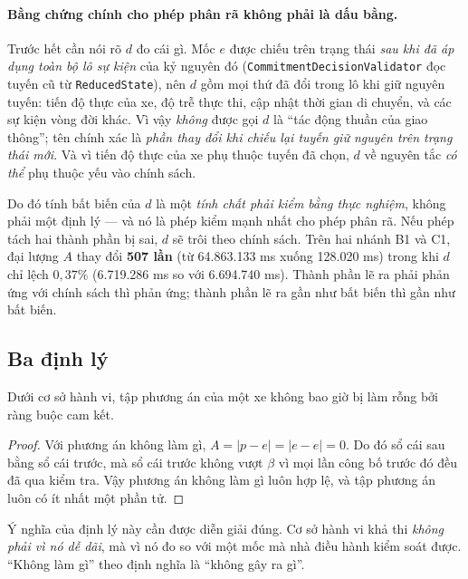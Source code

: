 \paragraph{Bằng chứng chính cho phép phân rã không phải là dấu bằng.} Trước hết cần nói rõ $d$
đo cái gì. Mốc $e$ được chiếu trên trạng thái \emph{sau khi đã áp dụng toàn bộ lô sự kiện} của
kỷ nguyên đó (\texttt{CommitmentDecisionValidator} đọc tuyến cũ từ \texttt{ReducedState}), nên
$d$ gồm mọi thứ đã đổi trong lô khi giữ nguyên tuyến: tiến độ thực của xe, độ trễ thực thi, cập
nhật thời gian di chuyển, và các sự kiện vòng đời khác. Vì vậy \emph{không} được gọi $d$ là
``tác động thuần của giao thông''; tên chính xác là \emph{phần thay đổi khi chiếu lại tuyến giữ
nguyên trên trạng thái mới}. Và vì tiến độ thực của xe phụ thuộc tuyến đã chọn, $d$ về nguyên
tắc \emph{có thể} phụ thuộc yếu vào chính sách.

Do đó tính bất biến của $d$ là một \emph{tính chất phải kiểm bằng thực nghiệm}, không phải một
định lý --- và nó là phép kiểm mạnh nhất cho phép phân rã. Nếu phép tách hai thành phần bị sai,
$d$ sẽ trôi theo chính sách. Trên hai nhánh B1 và C1, đại lượng $A$ thay đổi \textbf{507 lần}
(từ 64.863.133 ms xuống 128.020 ms) trong khi $d$ chỉ lệch \textbf{$0{,}37\%$} (6.719.286 ms so
với 6.694.740 ms). Thành phần lẽ ra phải phản ứng với chính sách thì phản ứng; thành phần lẽ ra
gần như bất biến thì gần như bất biến.

\subsection{Ba định lý}

\begin{dinhly}
Dưới cơ sở hành vi, tập phương án của một xe không bao giờ bị làm rỗng bởi ràng buộc cam kết.
\end{dinhly}

\begin{proof}
Với phương án không làm gì, $A = |p - e| = |e - e| = 0$. Do đó sổ cái sau bằng sổ cái trước,
mà sổ cái trước không vượt $\beta$ vì mọi lần công bố trước đó đều đã qua kiểm tra. Vậy phương
án không làm gì luôn hợp lệ, và tập phương án luôn có ít nhất một phần tử.
\end{proof}

Ý nghĩa của định lý này cần được diễn giải đúng. Cơ sở hành vi khả thi \emph{không phải vì nó
dễ dãi}, mà vì nó đo so với một mốc mà nhà điều hành kiểm soát được. ``Không làm gì'' theo định
nghĩa là ``không gây ra gì''.

